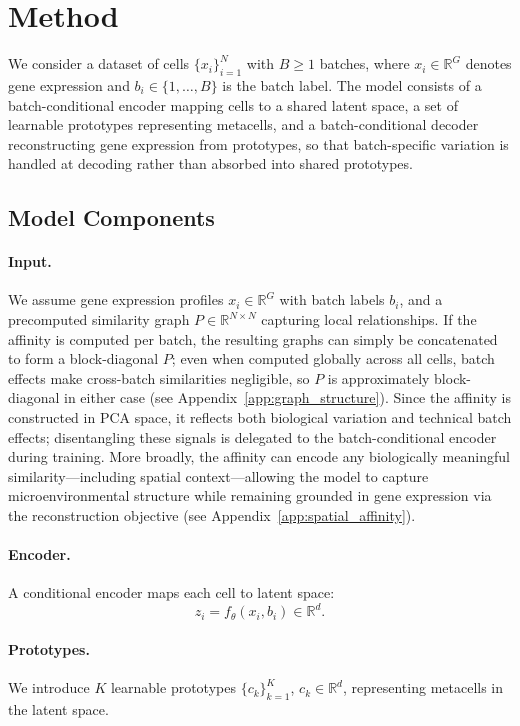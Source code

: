 \section{Method}

We consider a dataset of cells $\{x_i\}_{i=1}^N$ with $B \geq 1$ batches, where $x_i \in \mathbb{R}^G$ denotes gene expression and $b_i \in \{1, \dots, B\}$ is the batch label. The model consists of a batch-conditional encoder mapping cells to a shared latent space, a set of learnable prototypes representing metacells, and a batch-conditional decoder reconstructing gene expression from prototypes, so that batch-specific variation is handled at decoding rather than absorbed into shared prototypes.

\subsection{Model Components}

\paragraph{Input.}
We assume gene expression profiles $x_i \in \mathbb{R}^G$ with batch labels $b_i$, and a precomputed similarity graph $P \in \mathbb{R}^{N \times N}$ capturing local relationships.
If the affinity is computed per batch, the resulting graphs can simply be concatenated to form a block-diagonal $P$; even when computed globally across all cells, batch effects make cross-batch similarities negligible, so $P$ is approximately block-diagonal in either case (see Appendix~\ref{app:graph_structure}).
Since the affinity is constructed in PCA space, it reflects both biological variation and technical batch effects; disentangling these signals is delegated to the batch-conditional encoder during training.
More broadly, the affinity can encode any biologically meaningful similarity---including spatial context---allowing the model to capture microenvironmental structure while remaining grounded in gene expression via the reconstruction objective (see Appendix~\ref{app:spatial_affinity}).

\paragraph{Encoder.}
A conditional encoder maps each cell to latent space:
\[
z_i = f_\theta(x_i, b_i) \in \mathbb{R}^d.
\]

\paragraph{Prototypes.}
We introduce $K$ learnable prototypes $\{c_k\}_{k=1}^K$, $c_k \in \mathbb{R}^d$, representing metacells in the latent space.

